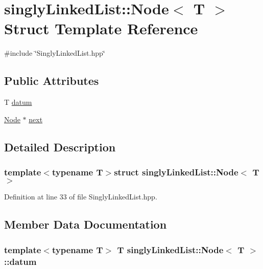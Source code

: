 \hypertarget{structsinglyLinkedList_1_1Node}{\section{singly\-Linked\-List\-:\-:Node$<$ T $>$ Struct Template Reference}
\label{structsinglyLinkedList_1_1Node}
}


{\ttfamily \#include \char`\"{}Singly\-Linked\-List.\-hpp\char`\"{}}

\subsection*{Public Attributes}
\begin{DoxyCompactItemize}
\item 
T \hyperlink{structsinglyLinkedList_1_1Node_a1bef890380acd2e1749ebc5c02b682a6}{datum}
\item 
\hyperlink{structsinglyLinkedList_1_1Node}{Node} $\ast$ \hyperlink{structsinglyLinkedList_1_1Node_a1f041f25521a6bfc726f4bff1426e0b3}{next}
\end{DoxyCompactItemize}


\subsection{Detailed Description}
\subsubsection*{template$<$typename T$>$struct singly\-Linked\-List\-::\-Node$<$ T $>$}



Definition at line 33 of file Singly\-Linked\-List.\-hpp.



\subsection{Member Data Documentation}
\hypertarget{structsinglyLinkedList_1_1Node_a1bef890380acd2e1749ebc5c02b682a6}{
\subsubsection[{datum}]{\setlength{\rightskip}{0pt plus 5cm}template$<$typename T$>$ T {\bf singly\-Linked\-List\-::\-Node}$<$ T $>$\-::datum}}\label{structsinglyLinkedList_1_1Node_a1bef890380acd2e1749ebc5c02b682a6}


